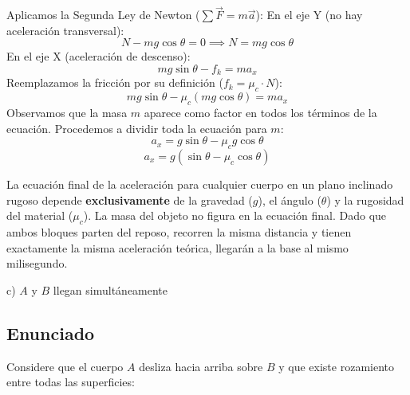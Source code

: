 \documentclass[12pt, a4paper]{article}
\begin{document}
Aplicamos la Segunda Ley de Newton ($\sum \vec{F} = m\vec{a}$):
En el eje Y (no hay aceleración transversal):
$$ N - mg \cos\theta = 0 \implies N = mg \cos\theta $$
En el eje X (aceleración de descenso):
$$ mg \sin\theta - f_k = m a_x $$
Reemplazamos la fricción por su definición ($f_k = \mu_c \cdot N$):
$$ mg \sin\theta - \mu_c (mg \cos\theta) = m a_x $$
Observamos que la masa $m$ aparece como factor en todos los términos de la ecuación. Procedemos a dividir toda la ecuación para $m$:
$$ a_x = g \sin\theta - \mu_c g \cos\theta $$
$$ a_x = g (\sin\theta - \mu_c \cos\theta) $$

La ecuación final de la aceleración para cualquier cuerpo en un plano inclinado rugoso depende \textbf{exclusivamente} de la gravedad ($g$), el ángulo ($\theta$) y la rugosidad del material ($\mu_c$). La masa del objeto no figura en la ecuación final.
Dado que ambos bloques parten del reposo, recorren la misma distancia y tienen exactamente la misma aceleración teórica, llegarán a la base al mismo milisegundo.

\begin{tcolorbox}[colback=green!5!white, colframe=green!50!black, title=Respuesta Final]
\centering \Large c) $A$ y $B$ llegan simultáneamente
\end{tcolorbox}

\newpage

\subsection*{Enunciado}
Considere que el cuerpo $A$ desliza hacia arriba sobre $B$ y que existe rozamiento entre todas las superficies:

\begin{center}
\end{center}
\end{document}
